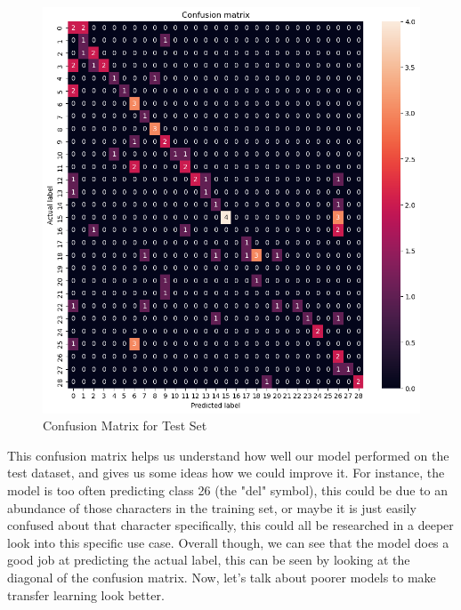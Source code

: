 \documentclass[12pt]{article}
\begin{document}
\begin{figure}[H]
    \centering
    \includegraphics*[scale=0.5]{images/confusion matrix.png}\\
    Confusion Matrix for Test Set
\end{figure}
This confusion matrix helps us understand how well our model performed on the test dataset, and gives us some ideas how we could improve it.
For instance, the model is too often predicting class 26 (the "del" symbol), this could be due to an abundance of those characters in the training set, or maybe it is just easily confused about that character 
specifically, this could all be researched in a deeper look into this specific use case. Overall though, we can see that the model does a good job 
at predicting the actual label, this can be seen by looking at the diagonal of the confusion matrix. Now, let's talk about poorer models to make transfer learning look better.\\
\end{document}
